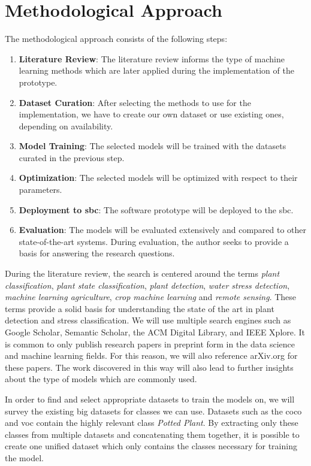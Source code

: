 \documentclass[final]{vutinfth} %
\begin{document}
\section{Methodological Approach}
\label{sec:methods}

The methodological approach consists of the following steps:

\begin{enumerate}
\item \textbf{Literature Review}: The literature review informs the
  type of machine learning methods which are later applied during the
  implementation of the prototype.
\item \textbf{Dataset Curation}: After selecting the methods to use
  for the implementation, we have to create our own dataset or use
  existing ones, depending on availability.
\item \textbf{Model Training}: The selected models will be trained
  with the datasets curated in the previous step.
\item \textbf{Optimization}: The selected models will be optimized
  with respect to their parameters.
\item \textbf{Deployment to \gls{sbc}}: The software prototype will be
  deployed to the \gls{sbc}.
\item \textbf{Evaluation}: The models will be evaluated extensively
  and compared to other state-of-the-art systems. During evaluation,
  the author seeks to provide a basis for answering the research
  questions.
\end{enumerate}

During the literature review, the search is centered around the terms
\emph{plant classification}, \emph{plant state classification},
\emph{plant detection}, \emph{water stress detection}, \emph{machine
learning agriculture}, \emph{crop machine learning} and \emph{remote
sensing}. These terms provide a solid basis for understanding the
state of the art in plant detection and stress classification. We will
use multiple search engines such as Google Scholar, Semantic Scholar,
the ACM Digital Library, and IEEE Xplore. It is common to only publish
research papers in preprint form in the data science and machine
learning fields. For this reason, we will also reference arXiv.org for
these papers. The work discovered in this way will also lead to
further insights about the type of models which are commonly used.

In order to find and select appropriate datasets to train the models
on, we will survey the existing big datasets for classes we can
use. Datasets such as the \gls{coco} \cite{lin2015} and
\gls{voc} \cite{everingham2010} contain the highly relevant class
\emph{Potted Plant}. By extracting only these classes from multiple
datasets and concatenating them together, it is possible to create one
unified dataset which only contains the classes necessary for training
the model.
\end{document}
